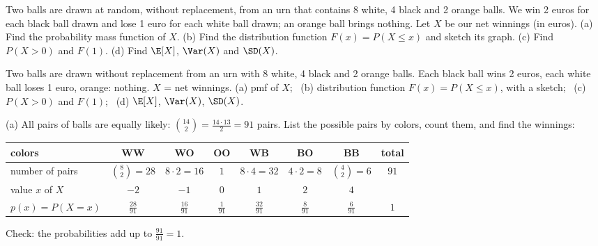
\begin{problem}
	Two balls are drawn at random, without replacement, from an urn that
	contains 8 white, 4 black and 2 orange balls. We win 2 euros for each black
	ball drawn and lose 1 euro for each white ball drawn; an orange ball brings
	nothing. Let $X$ be our net winnings (in euros).
	(a) Find the probability mass function of $X$.
	(b) Find the distribution function $F(x)=P(X\le x)$ and sketch its graph.
	(c) Find $P(X>0)$ and $F(1)$.
	(d) Find $\E[X]$, $\Var(X)$ and $\SD(X)$.
\end{problem}

\begin{slideproblem}
	Two balls are drawn without replacement from an urn with 8 white, 4 black
	and 2 orange balls. Each black ball wins 2 euros, each white ball loses
	1 euro, orange: nothing. $X$ = net winnings.
	(a) pmf of $X$; \ (b) distribution function $F(x)=P(X\le x)$, with a sketch;
	\ (c) $P(X>0)$ and $F(1)$; \ (d) $\E[X]$, $\Var(X)$, $\SD(X)$.
\end{slideproblem}

\begin{slides}
	\small
	\exstatement
	\pause
	\sol (a) All pairs of balls are equally likely:
	$\binom{14}{2}=\frac{14\cdot13}{2}=91$ pairs.
	\pause
	List the possible pairs by colors, count them, and find the winnings:
	\begin{center}
		\renewcommand{\arraystretch}{1.15}
		\begin{tabular}{l|cccccc|c}
			colors & WW & WO & OO & WB & BO & BB & total \\
			\hline
			number of pairs & $\binom82=28$ & $8\cdot2=16$ & $1$ & $8\cdot4=32$
			& $4\cdot2=8$ & $\binom42=6$ & $91$ \\
			\pause
			value $x$ of $X$ & $-2$ & $-1$ & $0$ & $1$ & $2$ & $4$ & \\
			\pause
			$p(x)=P(X=x)$ & $\frac{28}{91}$ & $\frac{16}{91}$ & $\frac{1}{91}$
			& $\frac{32}{91}$ & $\frac{8}{91}$ & $\frac{6}{91}$ & $1$ \\
		\end{tabular}
	\end{center}
	\pause
	Check: the probabilities add up to $\frac{91}{91}=1$.
\end{slides}

